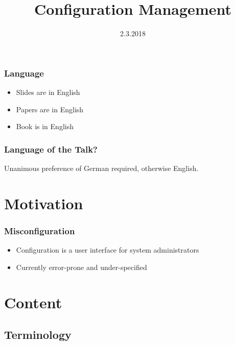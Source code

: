\documentclass{beamer}
\title[Configuration Management \hspace{25mm} \insertframenumber/\inserttotalframenumber]{Configuration Management}
\institute{Institute of Information Systems Engineering, TU Wien}
\date{2.3.2018}
\begin{document}
\begin{frame}
	\titlepage
\end{frame}

\begin{frame}
	\frametitle{Language}
	\begin{itemize}
		\item Slides are in English
		\item Papers are in English
		\item Book is in English
	\end{itemize}
\end{frame}

\begin{assignment}
	\frametitle{Language of the Talk?}
	Unanimous preference of German required, otherwise English.
\end{assignment}

\section{Motivation}

{
%
\begin{frame}
	\frametitle{Misconfiguration}
	\begin{itemize}
		\item Configuration is a user interface for system administrators
		\item Currently error-prone and under-specified
	\end{itemize}
\end{frame}
}
\begin{frame}
	\tableofcontents
\end{frame}

\section{Content}

\subsection{Terminology}
\end{document}
